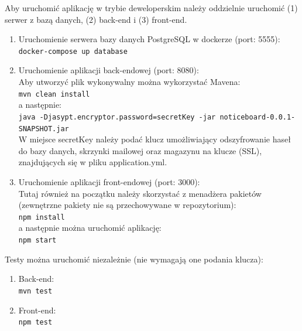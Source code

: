 \documentclass{article}
\begin{document}
    Aby uruchomić aplikację w trybie deweloperskim należy oddzielnie uruchomić (1) serwer z bazą danych, (2) back-end i (3) front-end.
\begin{enumerate}
    \item Uruchomienie serwera bazy danych PostgreSQL w dockerze (port: 5555):\\
    \texttt{docker-compose up database}\\
    \item Uruchomienie aplikacji back-endowej (port: 8080):\\
    Aby utworzyć plik wykonywalny można wykorzystać Mavena: \\
    \texttt{mvn clean install} \\
    a następnie: \\
    \texttt{java -Djasypt.encryptor.password=secretKey -jar noticeboard-0.0.1-SNAPSHOT.jar} \\
    W miejsce secretKey należy podać klucz umożliwiający odszyfrowanie haseł do bazy danych, skrzynki mailowej oraz magazynu na klucze (SSL), znajdujących się w pliku application.yml. \\
    \item Uruchomienie aplikacji front-endowej (port: 3000):\\
    Tutaj również na początku należy skorzystać z menadżera pakietów (zewnętrzne pakiety nie są przechowywane w repozytorium): \\
    \texttt{npm install} \\
    a następnie można uruchomić aplikację:\\
    \texttt{npm start}\\
\end{enumerate}
    Testy można uruchomić niezależnie (nie wymagają one podania klucza):
    \begin{enumerate}
        \item Back-end: \\
        \texttt{mvn test} \\
        \item Front-end: \\
        \texttt{npm test} \\
    \end{enumerate}

\end{document}
